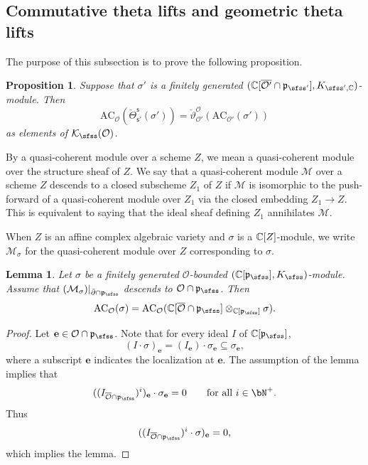 \documentclass[11pt,a4paper]{amsart}
\newcommand{\CK}{{\mathcal {K}}}
\newcommand{\CM}{{\mathcal {M}}}
\newcommand{\CO}{{\mathcal {O}}}
\newcommand{\p}{\mathfrak p}
\numberwithin{equation}{section}
\newtheorem{lem}[thm]{Lemma}
\newtheorem{prop}[thm]{Proposition}
\theoremstyle{remark}
\def\subset{\subseteq}
\begin{document}
\subsection{Commutative theta lifts and  geometric theta lifts}

The purpose of this subsection is to prove the following proposition.
\begin{prop}\label{propthetag}
Suppose that $\sigma'$ is a finitely generated  $(\C[\overline{\CO'}\cap \p_{\sfss'}], K_{\sfss', \C})$-module. Then
\[
\mathrm{AC}_{\CO}( \check \Theta_{\mathsf s'}^{\mathsf s}(\sigma'))= \check \vartheta_{\CO'}^{\CO}(\mathrm{AC}_{\CO'}(\sigma'))
\]
as elements of $\CK_\sfss(\CO)$.

\end{prop}


By a quasi-coherent module over a scheme $Z$, we mean a quasi-coherent module over the structure sheaf of $Z$. We say that a quasi-coherent module $\CM$ over a scheme $Z$ descends to a closed subscheme $Z_1$ of $Z$ if $\CM$ is isomorphic to the push-forward of a
 quasi-coherent module over $Z_1$ via the closed embedding $Z_1\rightarrow Z$. This is equivalent to saying that the ideal sheaf defining $Z_1$ annihilates $\CM$.

When $Z$ is an affine complex algebraic variety and $\sigma$ is a $\mathbb{C}[Z]$-module,
 we write $\CM_\sigma$ for  the quasi-coherent module over $Z$ corresponding to $\sigma$.

\begin{lem}\label{geotheta1}
Let $\sigma$ be a finitely generated $\CO$-bounded $(\C[\p_{\sfss}],K_{\sfss})$-module.  Assume that  $(\CM_\sigma)|_{\bar \partial\cap \p_\sfss}$ descends to $\CO\cap \p_\sfss$. Then
\[
  \mathrm{AC}_{\CO}(\sigma)=\mathrm{AC}_{\CO}(\C[\overline \CO\cap \p_{\sfss}]\otimes_{\C[\p_{\sfss}]} \sigma).
\]
\end{lem}
\begin{proof}
Let $\mathbf e\in \CO\cap \p_\sfss$. Note that for every ideal $I$ of $\C[\p_{\sfss}]$,
\[
  (I\cdot \sigma)_\mathbf e=(I_\mathbf e)\cdot \sigma_\mathbf e\subset  \sigma_\mathbf e,
\]
where a subscript $\mathbf e$ indicates the localization at $\mathbf e$. The assumption of the lemma implies that
\[
  ((I_{\overline{\CO}\cap \p_\sfss})^i)_\mathbf e \cdot \sigma_\mathbf e=0\qquad \textrm{for all } i\in \bN^+.
\]
Thus
\[
  ((I_{\overline{\CO}\cap \p_\sfss})^i \cdot \sigma)_\mathbf e=0,
\]
which implies the  lemma.
\end{proof}
\end{document}
